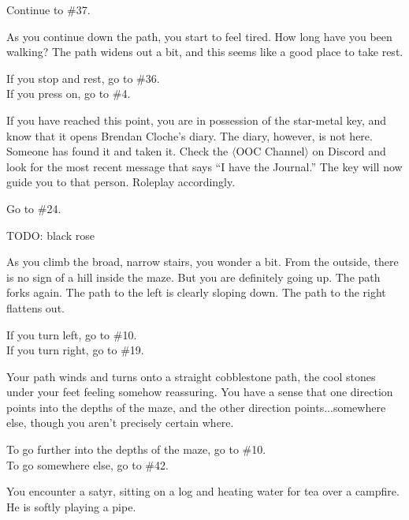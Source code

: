 \documentclass[green]{gl2018}
\begin{document}
\begin{large}
\begin{location}{19}
\begin{fromhere}  Continue to \#37.\end{fromhere}
\end{location}
\begin{location}{20}
As you continue down the path, you start to feel tired. How long have you been walking? The path widens out a bit, and this seems like a good place to take rest.
\begin{fromhere} If you stop and rest, go to \#36.\\
 If you press on, go to \#4.
\end{fromhere}
\end{location}
\begin{location}{21}
If you have reached this point, you are in possession of the star-metal key, and know that it opens Brendan Cloche's diary. The diary, however, is not here. Someone has found it and taken it. Check the $\langle$OOC Channel$\rangle$ on Discord and look for the most recent message that says ``I have the Journal.'' The key will now guide you to that person.  Roleplay accordingly. 
\begin{fromhere}Go to \#24.\end{fromhere}
\end{location}
\begin{location}{22}
TODO: black rose
\end{location}
\begin{location}{23}
As you climb the broad, narrow stairs, you wonder a bit. From the outside, there is no sign of a hill inside the maze. But you are definitely going up. The path forks again. The path to the left is clearly sloping down. The path to the right flattens out.
\begin{fromhere} If you turn left, go to \#10.\\ If you turn right,  go to \#19.\end{fromhere}
\end{location}
\begin{location}{24}
Your path winds and turns onto a straight cobblestone path, the cool stones under your feet feeling somehow reassuring.  You have a sense that one direction points into the depths of the maze, and the other direction points...somewhere else, though you aren't precisely certain where.  
\begin{fromhere}To go further into the depths of the maze, go to \#10.\\  To go somewhere else, go to \#42.\end{fromhere}
\end{location}
\begin{location}{25}
You encounter a satyr, sitting on a log and heating water for tea over a campfire.  He is softly playing a pipe.


\end{location}
\end{large}
\end{document}
